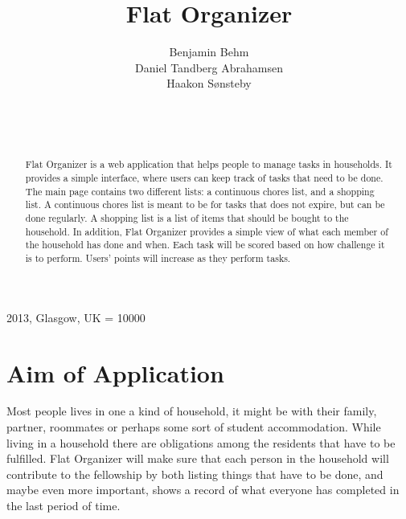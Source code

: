 \documentclass{sig-alt-release2}
\begin{document}
\newcommand{\todo}[1]{\textcolor{red}{#1}}
\def\newblock{\hskip .11em plus .33em minus .07em}

 {2013, Glasgow, UK} 
\widowpenalty = 10000

\title{{Flat Organizer}}

\author{
\alignauthor
Benjamin Behm\\
Daniel Tandberg Abrahamsen\\
Haakon S{\o}nsteby\\
	   \\
      \\
      \\
}
\maketitle

\begin{abstract}
Flat Organizer is a web application that helps people to manage tasks in
households. It provides a simple interface, where users can keep track of tasks
that need to be done. The main page contains two different lists: a continuous
chores list, and a shopping list. A continuous chores list is meant to be for
tasks that does not expire, but can be done regularly. A shopping list is a list
of items that should be bought to the household. In addition, Flat Organizer
provides a simple view of what each member of the household has done and when.
Each task will be scored based on how challenge it is to perform. Users' points
will increase as they perform tasks.

\end{abstract}

\section{Aim of Application}
Most people lives in one a kind of household, it might be with their family,
partner, roommates or perhaps some sort of student accommodation. While living
in a household there are obligations among the residents that have to be
fulfilled. Flat Organizer will make sure that each person in the household will
contribute to the fellowship by both listing things that have to be done, and
maybe even more important, shows a record of what everyone has completed in the
last period of time.
\end{document}
